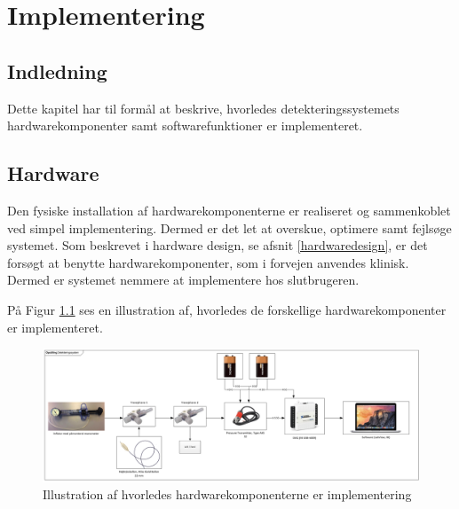 \chapter{Implementering} \label{implementering}


\section*{Indledning}
Dette kapitel har til formål at beskrive, hvorledes detekteringssystemets hardwarekomponenter samt softwarefunktioner er implementeret. 

\section{Hardware}
Den fysiske installation af hardwarekomponenterne er realiseret og sammenkoblet ved simpel implementering. Dermed er det let at overskue, optimere samt fejlsøge systemet. Som beskrevet i hardware design, se afsnit \ref{hardwaredesign}, er det forsøgt at benytte hardwarekomponenter, som i forvejen anvendes klinisk. Dermed er systemet nemmere at implementere hos slutbrugeren. 

På Figur \ref{Implementering1} ses en illustration af, hvorledes de forskellige hardwarekomponenter er implementeret. 

\begin{figure}[H]
	\centering
	\includegraphics[width=1\textwidth]{Figure/HW_implementering}
	\caption{Illustration af hvorledes hardwarekomponenterne er implementering}
    \label{Implementering1}
\end{figure}

